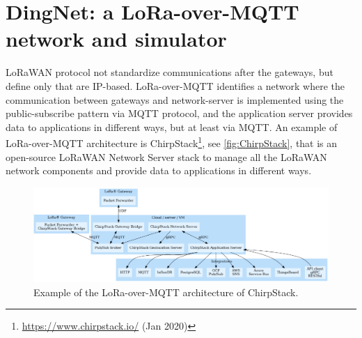 \section{DingNet: a LoRa-over-MQTT network and simulator}
\label{sec:DingNet}
LoRaWAN protocol not standardize communications after the gateways, but define only that are IP-based.
% 
LoRa-over-MQTT identifies a network where the communication between gateways and network-server is implemented using the public-subscribe pattern via MQTT protocol, and the application server provides data to applications in different ways, but at least via MQTT.
% 
An example of LoRa-over-MQTT architecture is ChirpStack\footnote{\href{https://www.chirpstack.io/}{https://www.chirpstack.io/} (Jan 2020)}, see \autoref{fig:ChirpStack}, that is an open-source LoRaWAN Network Server stack to manage all the LoRaWAN network components and provide data to applications in different ways.

\begin{figure}[h]
    \centering
    \includegraphics[width=\textwidth]{figures/chirpstack.png}
    \caption[LoRa-over-MQTT architecture]{Example of the LoRa-over-MQTT architecture of ChirpStack.~\cite{chirpstack2020}}
    \label{fig:ChirpStack}
\end{figure}

